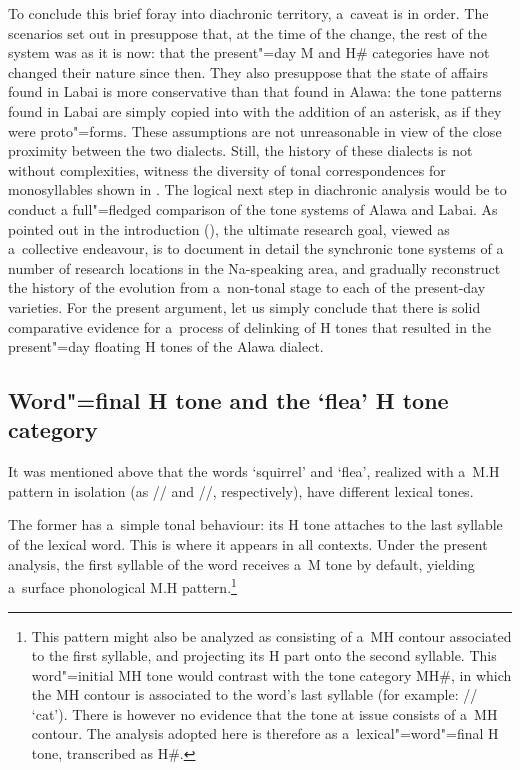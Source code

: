 To conclude this brief foray into diachronic territory, a~caveat is in order. The scenarios set out in  presuppose that, at the time of the change, the rest of the system was as it is now:
that the present"=day M and H\# categories have not changed their nature since then. They also presuppose that the state of affairs found in Labai is more {conservative} than that found in Alawa: the tone patterns found in Labai are simply copied into  with the addition of an asterisk, as if they were proto"=forms. 
These assumptions are not unreasonable in view of the close proximity between the two dialects. 
Still, the history of these dialects is not without complexities, witness the diversity of tonal correspondences for monosyllables shown in . The logical next step in diachronic analysis would be to conduct a full"=fledged comparison of the tone systems of Alawa and Labai. As pointed out in the introduction (), the ultimate research goal, viewed as a~collective endeavour, is to document in detail the synchronic tone systems of a number of research locations in the
Na-speaking area, and gradually reconstruct the history of the evolution from a~non-tonal stage to each
of the present-day varieties. For the present argument, let us simply conclude that there is solid comparative evidence for a~process of delinking of H tones that resulted in the present"=day floating H tones of the Alawa dialect. 

 
\subsection{Word"=final H tone and the ‘flea’ H tone category}
\label{sec:wordfinalandmorphologicalnucleusfinalHtones}

It was mentioned above that the words ‘squirrel’ and ‘flea’, realized with a~M.H pattern in
isolation (as // and //, respectively), have different lexical tones.

The former has a~simple tonal behaviour: its H tone attaches to the last syllable of the lexical
word. This is where it appears in all contexts. Under the present analysis, the first syllable of
the word receives a~M tone by default, yielding a~surface phonological M.H pattern.\footnote{This
  pattern might also be analyzed as consisting of a~MH {contour} associated to the first syllable, and projecting its H part onto the second syllable. This word"=initial MH tone would contrast with the tone category MH\#, in which the MH {contour} is associated to the word's
  last syllable (for example: // ‘cat’). There is however no evidence that the tone at issue
  consists of a~MH {contour}. The analysis adopted here is therefore as a~lexical"=word"=final
  H tone, transcribed as H\#.}

